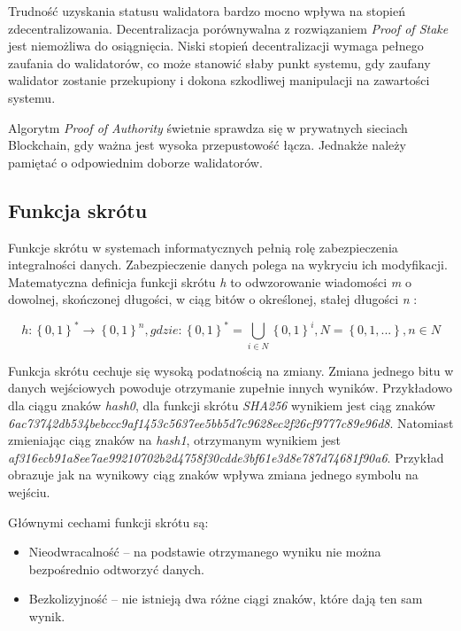 \documentclass[a4paper,12pt]{book}
\begin{document}
Trudność uzyskania statusu walidatora bardzo mocno wpływa na stopień zdecentralizowania. Decentralizacja porównywalna z rozwiązaniem \textit{Proof of Stake} jest niemożliwa do osiągnięcia.
Niski stopień decentralizacji wymaga pełnego zaufania do walidatorów, co może stanowić słaby punkt systemu, gdy zaufany walidator zostanie przekupiony i dokona szkodliwej manipulacji na zawartości systemu.

Algorytm \textit{Proof of Authority} świetnie sprawdza się w prywatnych sieciach Blockchain, gdy ważna jest wysoka przepustowość łącza. Jednakże należy pamiętać o odpowiednim doborze walidatorów\cite{abpoa}.

\subsection{Funkcja skrótu}

Funkcje skrótu w systemach informatycznych pełnią rolę zabezpieczenia integralności danych. Zabezpieczenie danych polega na wykryciu ich modyfikacji. Matematyczna definicja funkcji skrótu \textit{h} to odwzorowanie wiadomości \textit{m} o dowolnej, skończonej długości, w ciąg bitów o określonej, stałej długości \textit{n} \cite{hash}:

\begin{equation}
h:\left \{0, 1\right \}^{*}\rightarrow \left \{0, 1\right \}^{n}, gdzie: \left \{0, 1\right \}^{*}=\bigcup_{i\in  N}\left \{0, 1\right \}^{i}, N = \left \{0, 1, ...\right \}, n \in N
\end{equation}

Funkcja skrótu cechuje się wysoką podatnością na zmiany. Zmiana jednego bitu w danych wejściowych powoduje otrzymanie zupełnie innych wyników. \newline
Przykładowo dla ciągu znaków \textit{hash0}, dla funkcji skrótu \textit{SHA256} wynikiem jest ciąg znaków
\newline \textit{6ac73742db534bebccc9af1453c5637ee5bb5d7c9628ec2f26cf9777c89e96d8}. Natomiast zmieniając ciąg znaków na \textit{hash1}, otrzymanym wynikiem jest \newline \textit{af316ecb91a8ee7ae99210702b2d4758f30cdde3bf61e3d8e787d74681f90a6}. Przykład obrazuje jak na wynikowy ciąg znaków wpływa zmiana jednego symbolu na wejściu.

Głównymi cechami funkcji skrótu są:
\begin{itemize}
	\item Nieodwracalność -- na podstawie otrzymanego wyniku nie można bezpośrednio odtworzyć danych.
	\item Bezkolizyjność -- nie istnieją dwa różne ciągi znaków, które dają ten sam wynik.
\end{itemize}
\end{document}
